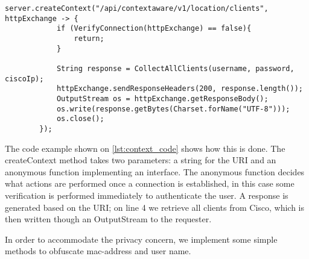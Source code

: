 \begin{lstlisting}[caption={Adding a URI},label={lst:context_code},language=inc_Java]
server.createContext("/api/contextaware/v1/location/clients", httpExchange -> {
            if (VerifyConnection(httpExchange) == false){
                return;
            }

            String response = CollectAllClients(username, password, ciscoIp);
            httpExchange.sendResponseHeaders(200, response.length());
            OutputStream os = httpExchange.getResponseBody();
            os.write(response.getBytes(Charset.forName("UTF-8")));
            os.close();
        });
\end{lstlisting}
The code example shown on \cref{lst:context_code} shows how this is done. The createContext method takes two parameters: a string for the URI and an anonymous function implementing an interface. The anonymous function decides what actions are performed once a connection is established, in this case some verification is performed immediately to authenticate the user. A response is generated based on the URI; on line 4 we retrieve all clients from Cisco, which is then written though an OutputStream to the requester. 

In order to accommodate the privacy concern, we implement some simple methods to obfuscate mac-address and user name. 